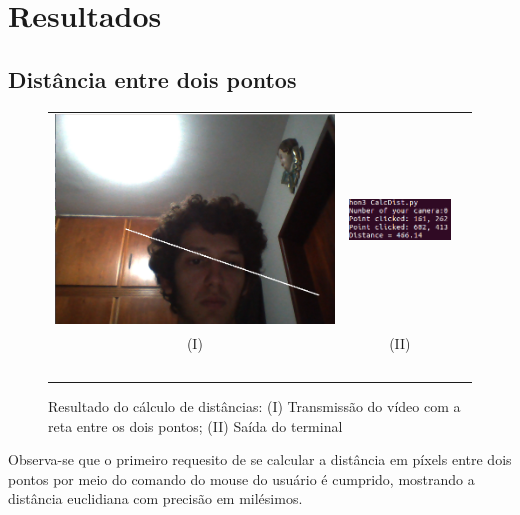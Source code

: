 \documentclass{bmvc2k}
\begin{document}
\section{Resultados}
\subsection{Distância entre dois pontos}

\begin{figure}[H]
    \centering
    \begin{tabular}{ccc}
    \includegraphics[width=.28\textwidth]{Figs/execution_DP2.png}&
    \includegraphics[width=.28\textwidth]{Figs/terminal_DP2.png}\\
    (I)&(II)\\\
    \end{tabular}
    \caption{Resultado do cálculo de distâncias:  (I) Transmissão do vídeo com a reta entre os dois pontos; (II) Saída do terminal}
    \label{fig:Req1}
\end{figure}

Observa-se que o primeiro requesito de se calcular a distância em píxels entre dois pontos por meio do comando do mouse do usuário é cumprido, mostrando a distância euclidiana com precisão em milésimos. 
\end{document}
